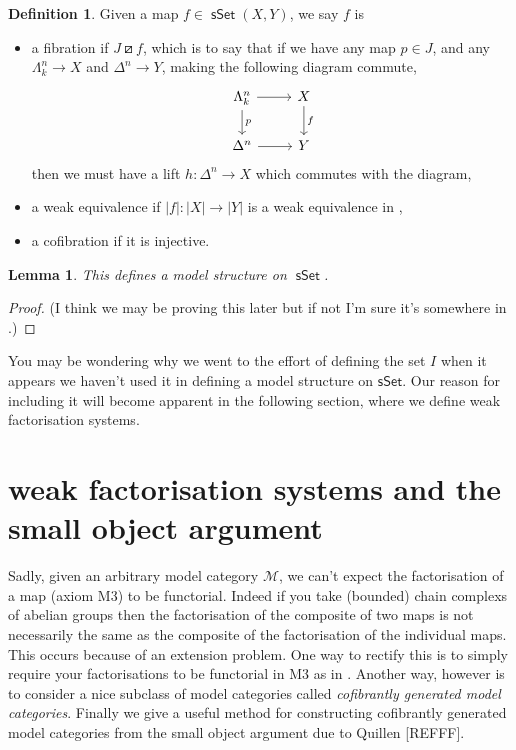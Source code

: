 \documentclass{amsart}
\newcommand{\catname}[1]{{\sffamily\upshape{{#1}}}}
\newcommand{\topp}{\catname{Top}}
\DeclareMathOperator{\msset}{\mathsf{sSet}}
\newtheorem{lemma}[theorem]{Lemma}
\theoremstyle{definition}
\newtheorem{definition}[theorem]{Definition}
\begin{document}
\begin{definition}
  Given a map $f\in \msset (X,Y)$, we say $f$ is
  \begin{itemize}
  \item a fibration if $J \boxslash f$, which is to say that if
    we have any map $p\in J$, and any $\Lambda^n_k \to X$
    and $\Delta^n \to Y$, making the following diagram commute,
    \[
    \begin{tikzcd}
      \Lambda^n_k \arrow[r] \arrow[d, "p"] & X \arrow[d, "f"] \\
      \Delta^n \arrow[r] &Y
    \end{tikzcd}
  \]
  then we must have a lift $h: \Delta^n \to X$ which commutes with the diagram,
\item a weak equivalence if $|f|: |X|\to |Y|$ is a weak equivalence in
  \topp,
\item a cofibration if it is injective.
\end{itemize}
\end{definition}
\begin{lemma}
  This defines a model structure on $\msset$.
\end{lemma}
\begin{proof}
  (I think we may be proving this later but if not I'm sure it's somewhere
  in \cite{Hov}.)
\end{proof}
You may be wondering why we went to the effort of defining the set $I$ when it
appears we haven't used it in defining a model structure on
$\mathsf{sSet}$. Our reason for including it will become apparent
in the following section, where we define weak factorisation systems.

\section{weak factorisation systems and the small object argument}
Sadly, given an arbitrary model category $\mathcal{M}$, we can't expect the
factorisation of a map (axiom M3) to be functorial. Indeed if you take
(bounded) chain complexs of abelian groups then the factorisation of the
composite of two maps is not necessarily the same as the
composite of the factorisation of the individual maps. This occurs because of
an extension problem. One way to rectify this is to
simply require your factorisations
to be functorial in M3 as in \cite{Hov}. Another way, however is to consider a
nice subclass of model categories called \textit{cofibrantly generated model
  categories}. Finally we give a useful
method for constructing cofibrantly generated model categories from the
small object argument due to Quillen [REFFF].
\end{document}
